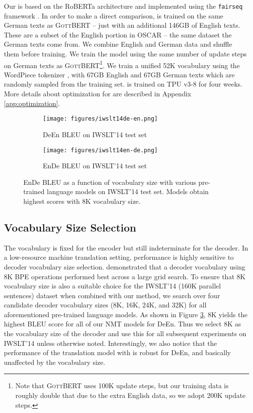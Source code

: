 \documentclass[11pt]{article}
\begin{document}
Our  is based on the RoBERTa architecture \citep{liu2019roberta} and implemented using the \texttt{fairseq} framework \citep{ott-etal-2019-fairseq}. In order to make a direct comparison,  is trained on the same German texts as \textsc{GottBERT} -- just with an additional 146GB of English texts. These are a subset of the English portion in OSCAR -- the same dataset the German texts come from. We combine English and German data and shuffle them before training. We train the model using the same number of update steps on German texts as \textsc{GottBERT}\footnote{Note that \textsc{GottBERT} uses 100K update steps, but our training data is roughly double that due to the extra English data, so we adopt 200K update steps.}. We train a unified 52K vocabulary using the WordPiece tokenizer \citep{wu2016google},  with 67GB English and 67GB German texts which are randomly sampled from the training set.  is trained on TPU v3-8 for four weeks. More details about optimization for  are described in Appendix \ref{app:optimization}.


\begin{figure}[ht]
     \centering
     \begin{subfigure}[b]{0.48\textwidth}
         \centering
         \texttt{[image: figures/iwslt14de-en.png]}
         \caption{DeEn BLEU on IWSLT'14 test set}
         \label{fig:iwslt14-de-en}
     \end{subfigure}
     \hfill
     \begin{subfigure}[b]{0.48\textwidth}
         \centering
         \texttt{[image: figures/iwslt14en-de.png]}
         \caption{EnDe BLEU on IWSLT'14 test set}
         \label{fig:iwslt14-en-de}
     \end{subfigure}
     \caption{EnDe BLEU as a function of vocabulary size with various pre-trained language models on IWSLT'14 test set. Models obtain highest scores with 8K vocabulary size.}
     \label{fig:iwslt14}
\end{figure}




\subsection{Vocabulary Size Selection}
\label{subsec:vocab}
The vocabulary is fixed for the encoder but still indeterminate for the decoder. In a low-resource machine translation setting, performance is highly sensitive to decoder vocabulary size selection. \citet{gowda-may-2020-finding} demonstrated that a decoder vocabulary using 8K BPE operations performed best across a large grid search. To ensure that 8K vocabulary size is also a suitable choice for the IWSLT'14 (160K parallel sentences) dataset when combined with our method, we search over four candidate decoder vocabulary sizes (8K, 16K, 24K, and 32K) for all aforementioned pre-trained language models. As shown in Figure \ref{fig:iwslt14}, 8K yields the highest BLEU score for all of our NMT models for DeEn. Thus we select 8K as the vocabulary size of the decoder and use this for all subsequent experiments on IWSLT'14 unless otherwise noted. Interestingly, we also notice that the performance of the translation model with  is robust for DeEn, and basically unaffected by the vocabulary size. 
\end{document}
